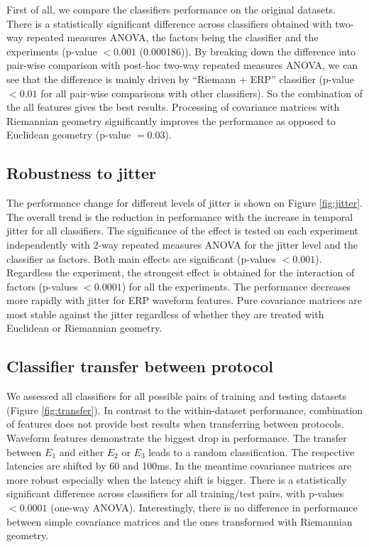 \documentclass[12pt]{iopart}
\begin{document}
First of all, we compare the classifiers performance on the original datasets. There
is a statistically significant difference across classifiers obtained with two-way repeated
measures ANOVA, the factors being the classifier and the experiments (p-value $< 0.001$
(0.000186)). By breaking down the difference into pair-wise comparison with post-hoc
two-way repeated measures ANOVA, we can see that the difference is mainly driven by
``Riemann + ERP'' classifier (p-value $< 0.01$ for all pair-wise comparisons with other
classifiers). So the combination of the all features gives the best results. Processing of
covariance matrices with Riemannian geometry significantly improves the performance
as opposed to Euclidean geometry (p-value $= 0.03$).


\subsection{Robustness to jitter}

The performance change for different levels of jitter is shown on Figure \ref{fig:jitter}.
The overall trend is the reduction in performance with the increase in temporal jitter for all classifiers.
The significance of the effect is tested on each experiment independently
with 2-way repeated measures ANOVA for the jitter level and the classifier
as factors. Both main effects are significant (p-values $<0.001$). 
Regardless the experiment, the strongest effect is obtained for the interaction
of factors (p-values $< 0.0001$) for all the experiments. The performance decreases more
rapidly with jitter for ERP waveform features.
Pure covariance matrices are most stable against the jitter regardless of whether they are
treated with Euclidean or Riemannian geometry.

\subsection{Classifier transfer between protocol}
We assessed all classifiers for all possible pairs of training 
and testing datasets (Figure \ref{fig:transfer}).
In contrast to the within-dataset performance, combination of features
does not provide best results when transferring between protocols.
Waveform features demonstrate the biggest drop
in performance. The transfer between $E_1$ and either $E_2$ or $E_3$
leads to a random classification. The respective latencies are shifted by 60 and 100ms.
In the meantime covariance matrices are more robust
especially when the latency shift is bigger.
There is a statistically significant difference across classifiers
for all training/test pairs, with p-values $< 0.0001$ (one-way ANOVA).
Interestingly, there is no difference in performance between simple covariance matrices
and the ones transformed with Riemannian geometry.
\end{document}
